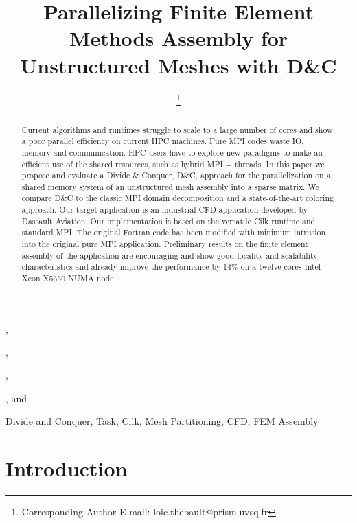 \documentclass[10pt]{IOS-Book-Article}
\begin{document}
\begin{frontmatter}              %

\title{Parallelizing Finite Element Methods Assembly for Unstructured Meshes with D\&C}

\author[A]{ %
\thanks{Corresponding Author E-mail: loic.thebault@prism.uvsq.fr}},
\author[A]{ },
\author[D]{ },
\author[B]{ },
and
\author[A,D]{ }

\address[A]{PRISM - University of Versailles, France}
\address[B]{Dassault Aviation, Saint-Cloud, France}
\address[D]{Exascale Computing Research, France}

\begin{abstract}
Current algorithms and runtimes struggle to scale to a large number of cores and show a poor parallel efficiency on current HPC machines.
Pure MPI codes waste IO, memory and communication. HPC users have to explore new paradigms to make an efficient use of the shared resources, such as hybrid MPI + threads.
In this paper we propose and evaluate a Divide \& Conquer, D\&C, approach for the parallelization  on a shared memory system of an unstructured mesh assembly into a sparse matrix.
We compare D\&C to the classic MPI domain decomposition and a state-of-the-art coloring approach.
Our target application is an industrial CFD application developed by Dassault Aviation.
Our implementation is based on the versatile Cilk runtime and standard MPI.
The original Fortran code has been modified with minimum intrusion into the original pure MPI application.
Preliminary results on the finite element assembly of the application are encouraging and show good locality and scalability characteristics and already improve the performance by 14\% on a twelve cores Intel Xeon X5650 NUMA node.
\end{abstract}

\begin{keyword}
Divide and Conquer, Task, Cilk, Mesh Partitioning, CFD, FEM Assembly
\end{keyword}
\end{frontmatter}

\thispagestyle{empty}
\pagestyle{empty}

\section{Introduction}
\end{document}
